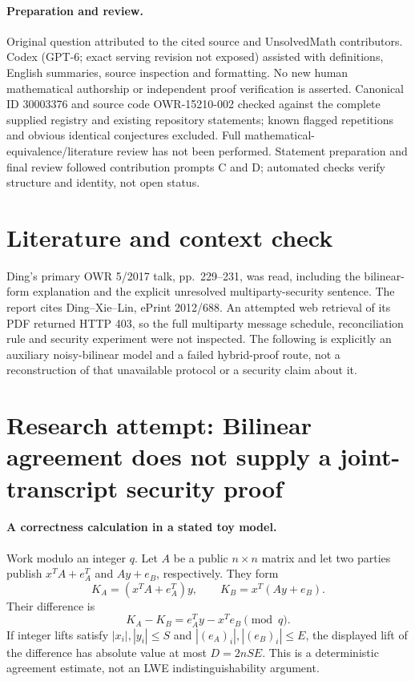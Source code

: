 \documentclass[11pt]{article}
\begin{document}
\paragraph{Preparation and review.}
Original question attributed to the cited source and UnsolvedMath contributors. Codex (GPT-6; exact serving revision not exposed) assisted with definitions, English summaries, source inspection and formatting. No new human mathematical authorship or independent proof verification is asserted. Canonical ID 30003376 and source code OWR-15210-002 checked against the complete supplied registry and existing repository statements; known flagged repetitions and obvious identical conjectures excluded. Full mathematical-equivalence/literature review has not been performed. Statement preparation and final review followed contribution prompts C and D; automated checks verify structure and identity, not open status.
\label{end:30003376}

\section{Literature and context check}
Ding's primary OWR 5/2017 talk, pp.~229--231, was read, including the bilinear-form explanation and the explicit unresolved multiparty-security sentence. The report cites Ding--Xie--Lin, ePrint 2012/688. An attempted web retrieval of its PDF returned HTTP 403, so the full multiparty message schedule, reconciliation rule and security experiment were not inspected. The following is explicitly an auxiliary noisy-bilinear model and a failed hybrid-proof route, not a reconstruction of that unavailable protocol or a security claim about it.
\section{Research attempt: Bilinear agreement does not supply a joint-transcript security proof}

\paragraph{A correctness calculation in a stated toy model.}
Work modulo an integer $q$. Let $A$ be a public $n\times n$ matrix and let two parties publish $x^TA+e_A^T$ and $Ay+e_B$, respectively. They form
\[
 K_A=(x^TA+e_A^T)y,\qquad K_B=x^T(Ay+e_B).
\]
Their difference is
\[
 K_A-K_B=e_A^Ty-x^Te_B\pmod q.
\]
If integer lifts satisfy $|x_i|,|y_i|\le S$ and $|(e_A)_i|,|(e_B)_i|\le E$, the displayed lift of the difference has absolute value at most $D=2nSE$. This is a deterministic agreement estimate, not an LWE indistinguishability argument.
\end{document}
